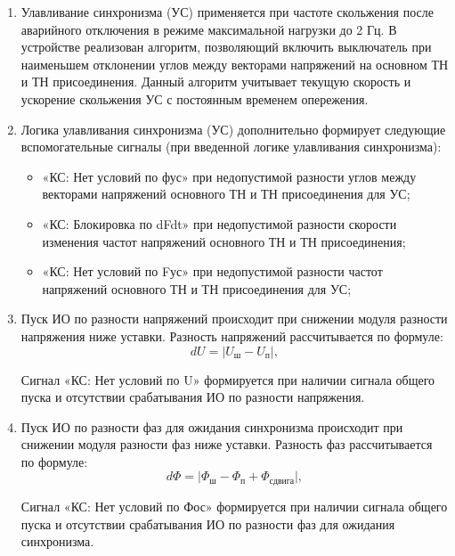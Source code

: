 \begin{enumerate}
\item
Улавливание синхронизма (УС) применяется при частоте скольжения после аварийного отключения в режиме максимальной нагрузки до 2 Гц. В устройстве реализован алгоритм, позволяющий включить выключатель при наименьшем отклонении углов между векторами напряжений на основном ТН и ТН присоединения. Данный алгоритм учитывает текущую скорость и ускорение скольжения УС с постоянным временем опережения.

\item Логика улавливания синхронизма (УС) дополнительно формирует следующие вспомогательные сигналы (при введенной логике улавливания синхронизма):
\begin{itemize}
    \item «КС: Нет условий по фус» при недопустимой разности углов между векторами напряжений основного ТН и ТН присоединения для УС;
    \item «КС: Блокировка по dFdt»  при недопустимой разности скорости изменения частот напряжений основного ТН и ТН присоединения;
    \item «КС: Нет условий по Fус» при недопустимой разности частот напряжений основного ТН и ТН присоединения для УС;
\end{itemize}  

\item
Пуск ИО по разности напряжений происходит при снижении модуля разности напряжения ниже уставки. Разность напряжений рассчитывается по формуле:
\begin{equation*}
   dU= \lvert U_{\text{ш}} -  U_{\text{п}}   \rvert,
\end{equation*}
Сигнал «КС: Нет условий по U» формируется при наличии сигнала общего пуска и отсутствии срабатывания ИО по разности напряжения.

\item
Пуск ИО по разности фаз для ожидания синхронизма происходит при снижении модуля разности фаз ниже уставки. Разность фаз рассчитывается по формуле:
\begin{equation*}
   d\Phi= \lvert \Phi_{\text{ш}} - \Phi_{\text{п}} + \Phi_{\text{сдвига}} \rvert ,
\end{equation*}
Сигнал «КС: Нет условий по Фос» формируется при наличии сигнала общего пуска и отсутствии срабатывания ИО по разности фаз для ожидания синхронизма.


\end{enumerate}
